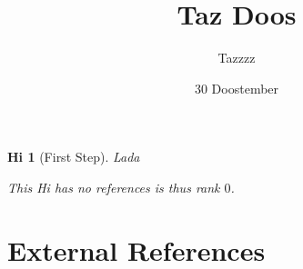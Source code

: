 \documentclass{article}
\title{Taz Doos}
\author{Tazzzz}
\date{30 Doostember}
\newtheorem{Hi}{Hi}
\begin{document}
\maketitle

\begin{tcolorbox}[title=Hi: First Step]\begin{Hi}[First Step]\label{0}Lada
 
 This Hi has no references is thus rank $0$.\end{Hi}\end{tcolorbox}
\section*{External References}
\begin{enumerate}[label={[\arabic*]}]\end{enumerate}
\end{document}
